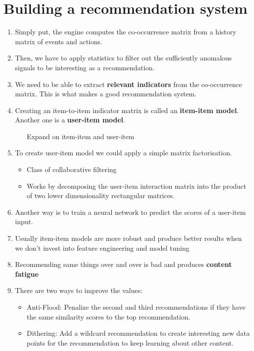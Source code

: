 \documentclass[12pt,a4paper]{article}
\begin{document}
\section*{Building a recommendation system}
\begin{enumerate}
  \item Simply put, the engine computes the co-occurrence matrix
        from a history matrix of events and actions. 
  \item Then, we have to apply statistics to filter out the 
        sufficiently anomalous signals to be interesting as a 
        recommendation.
  \item We need to be able to extract \textbf{relevant indicators} 
        from the co-occurrence matrix. This is what makes a good 
        recommendation system.
  \item Creating an item-to-item indicator matrix is called an 
        \textbf{item-item model}. Another one is a \textbf{user-item model}.
  \begin{itemize}
    \item [Expand on item-item and user-item]
  \end{itemize}
  \item To create user-item model we could apply a simple matrix 
        factorisation.
  \begin{itemize}
    \item Class of collaborative filtering
    \item Works by decomposing the user-item interaction matrix 
          into the product of two lower dimensionality rectangular 
          matrices.
  \end{itemize}
  \item Another way is to train a neural network to predict the scores of 
        a user-item input.
  \item Usually item-item models are more robust and produce better 
        results when we don't invest into feature engineering and model tuning
  \item Recommending same things over and over is bad and produces 
        \textbf{content fatigue}
  \item There are two ways to improve the values:
  \begin{itemize}
    \item Anti-Flood: Penalize the second and third recommendations if 
          they have the same similarity scores to the top recommendation.
    \item Dithering: Add a wildcard recommendation to create interesting 
          new data points for the recommendation to keep learning about 
          other content. 
    
  \end{itemize}
\end{enumerate}
\end{document}
